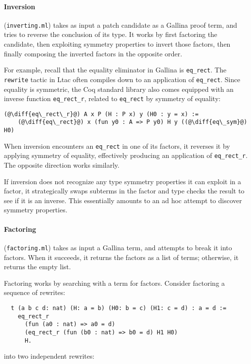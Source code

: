 \paragraph{Inversion}  (\lstinline{inverting.ml}) takes as input a patch candidate as a Gallina proof term,
and tries to reverse the conclusion of its type.
It works by first factoring the candidate,
then exploiting symmetry properties to invert those factors,
then finally composing the inverted factors in the opposite order.

For example, recall that the equality eliminator in Gallina is \lstinline{eq_rect}.
The \lstinline{rewrite} tactic in Ltac often compiles down to an application of \lstinline{eq_rect}. %
Since equality is symmetric, the Coq standard library also comes equipped with an inverse function \lstinline{eq_rect_r},
related to \lstinline{eq_rect} by symmetry of equality:

\begin{lstlisting}[language=coq]
  (@\diff{eq\_rect\_r}@) A x P (H : P x) y (H0 : y = x) :=
    (@\diff{eq\_rect}@) x (fun y0 : A => P y0) H y ((@\diff{eq\_sym}@) H0)	
\end{lstlisting} %
When inversion encounters an \lstinline{eq_rect} in one of its factors,
it reverses it by applying symmetry of equality, effectively producing an application of \lstinline{eq_rect_r}.
The opposite direction works similarly.

If inversion does not recognize any type symmetry properties it can exploit in a factor, it
strategically swaps subterms in the factor and type checks the result to see if it is an inverse.
This essentially amounts to an ad hoc attempt to discover symmetry properties.

\paragraph{Factoring}  (\lstinline{factoring.ml}) takes as input a Gallina term,
and attempts to break it into factors.
When it succeeds, it returns the factors as a list of terms;
otherwise, it returns the empty list.

Factoring works by searching with a term for factors.
Consider factoring a sequence of rewrites:
\begin{lstlisting}
  t (a b c d: nat) (H: a = b) (H0: b = c) (H1: c = d) : a = d :=
    eq_rect_r
      (fun (a0 : nat) => a0 = d)
      (eq_rect_r (fun (b0 : nat) => b0 = d) H1 H0)
      H.
\end{lstlisting}
into two independent rewrites:

